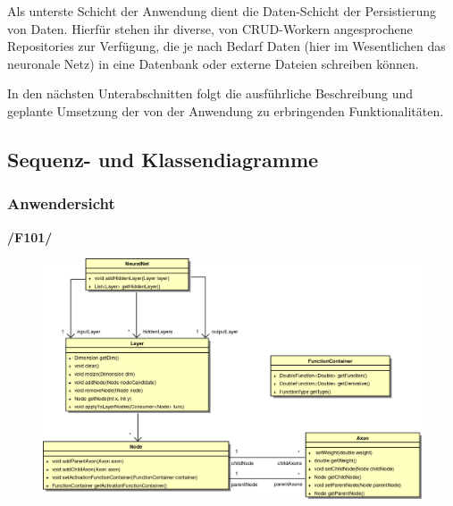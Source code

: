 Als unterste Schicht der Anwendung dient die Daten-Schicht der Persistierung von Daten. Hierfür stehen ihr diverse, von CRUD-Workern angesprochene Repositories zur Verfügung, die je nach Bedarf Daten (hier im Wesentlichen das neuronale Netz) in eine Datenbank oder externe Dateien schreiben können.

In den nächsten Unterabschnitten folgt die ausführliche Beschreibung und geplante Umsetzung der von der Anwendung zu erbringenden Funktionalitäten.  

\subsection{Sequenz- und Klassendiagramme}
\subsubsection{Anwendersicht}

\textbf{/F101/}

\begin{figure}[h]
\begin{center}
\includegraphics[width=\textwidth]{Abbildungen/UML/uml_ronny/neuralNetKlassenDiagramm.png}
\end{center}
\end{figure}


